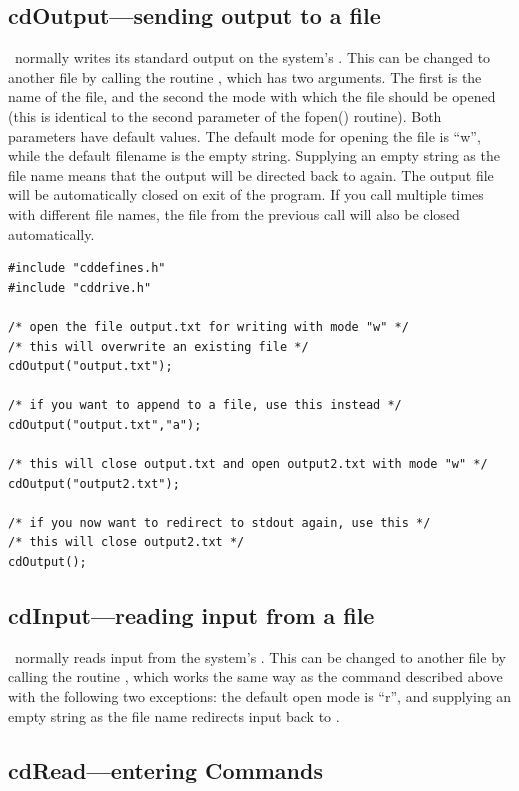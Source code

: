 \subsection{cdOutput---sending output to a file}

\Cloudy\ normally writes its standard output on the system's
. This can be changed to another file by calling the
routine , which has two arguments. The first is the name
of the file, and the second the mode with which the file should be opened
(this is identical to the second parameter of the fopen() routine). Both
parameters have default values. The default mode for opening the file is
``w'', while the default filename is the empty string. Supplying an empty
string as the file name means that the output will be directed back to
 again. The output file will be automatically closed on
exit of the program. If you call  multiple times with
different file names, the file from the previous call will also be closed
automatically.
\begin{verbatim}
#include "cddefines.h"
#include "cddrive.h"

/* open the file output.txt for writing with mode "w" */
/* this will overwrite an existing file */
cdOutput("output.txt");

/* if you want to append to a file, use this instead */
cdOutput("output.txt","a");

/* this will close output.txt and open output2.txt with mode "w" */
cdOutput("output2.txt");

/* if you now want to redirect to stdout again, use this */
/* this will close output2.txt */
cdOutput();
\end{verbatim}

\subsection{cdInput---reading input from a file}

\Cloudy\ normally reads input from the system's . This can
be changed to another file by calling the routine , which
works the same way as the  command described above with
the following two exceptions: the default open mode is ``r'', and supplying
an empty string as the file name redirects input back to .

\subsection{cdRead---entering Commands}

